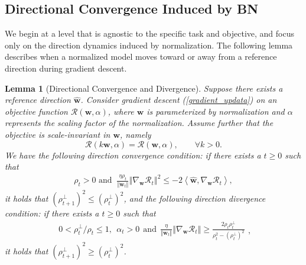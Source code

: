 \documentclass[pdflatex,sn-basic]{sn-jnl}%
\theoremstyle{thmstyleone}%
\newtheorem{lemma}[theorem]{Lemma}
\begin{document}
\subsection{Directional Convergence Induced by BN}\label{Directional_Convergence}
We begin at a level that is agnostic to the specific task and objective, and focus only on the direction dynamics induced by normalization. 
The following lemma describes when a normalized model moves toward or away from a reference direction during gradient descent.
\begin{lemma}[Directional Convergence and Divergence]\label{Direction_Convegence_and_Divergence}
  Suppose there exists a reference direction $\hat{\mathbf{w}}$. 
  Consider gradient descent (\ref{gradient_updata}) on an objective function 
  $\mathcal{R} \left(\mathbf{w}, \alpha\right)$, where $\mathbf{w}$
  is parameterized by normalization and $\alpha$ represents the scaling factor of the normalization.
  Assume further that the objective is scale-invariant in $\mathbf{w}$, namely
  \[
    \mathcal{R}(k \mathbf{w}, \alpha) = \mathcal{R}(\mathbf{w}, \alpha),
    \qquad \forall k > 0.
  \]
  We have the following direction convergence condition: 
  if there exists a $t \ge 0$ such that 
  \begin{equation*}
  \begin{aligned}
  \rho_t > 0 \text{ and }\ 
    \frac{\eta {\rho}_{t}}{\Vert \mathbf{w}_{t} \Vert}
    \left\Vert
      \nabla_{\mathbf{w}} \mathcal{R}_t
    \right\Vert^2
    \le 
    - 2
    \left\langle 
      \hat{\mathbf{w}},
      \nabla_{\mathbf{w}} \mathcal{R}_t
    \right\rangle,
  \end{aligned}
  \end{equation*}
  it holds that $\left( {\rho}_{t+1}^{\perp} \right)^2 \le \left( {\rho}_{t}^{\perp}\right)^2$, 
  and the following direction divergence condition: 
  if there exists a $t \ge 0$ such that 
  \begin{equation*}
  \begin{aligned}
  0 < \rho_t^{\perp} / \rho_t \le 1, \ \ \alpha_t > 0
  \ \ \text{and} \ \ 
    \frac{\eta }{\Vert \mathbf{w}_t \Vert} 
    \left\Vert 
      \nabla_{\mathbf{w}} \mathcal{R}_t
    \right\Vert
    \ge
    \frac{2  {\rho}_t {\rho}_t^{\perp}}{
      {\rho}_t^2 
      - \left({\rho}_t^{\perp}\right)^2
    }
  \end{aligned},
  \end{equation*}
  it holds that $\left({\rho}_{t+1}^{\perp}\right)^2 \ge \left({\rho}_{t}^{\perp}\right)^2$. 
\end{lemma}
\end{document}
